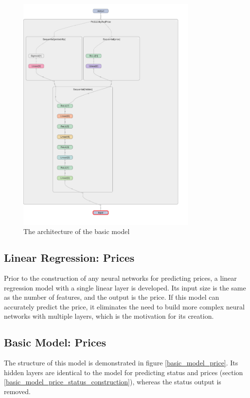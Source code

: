 \documentclass[12pt,twoside]{report}
\begin{document}
\begin{figure}[!htbp]
	\centering
	\includegraphics[height=12cm]{basic_model_layout}
	\caption{The architecture of the basic model}
	\label{basic_model_layout}
\end{figure}

\subsection{Linear Regression: Prices}
\label{linear_regression_model_construction}
Prior to the construction of any neural networks for predicting prices, a linear regression model with a single linear layer is developed. Its input size is the same as the number of features, and the output is the price. If this model can accurately predict the price, it eliminates the need to build more complex neural networks with multiple layers, which is the motivation for its creation. 

\subsection{Basic Model: Prices}
The structure of this model is demonstrated in figure \ref{basic_model_price}. Its hidden layers are identical to the model for predicting status and prices (section \ref{basic_model_price_status_construction}), whereas the status output is removed.
\end{document}
